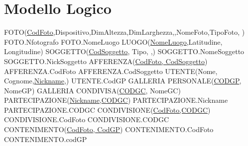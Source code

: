 \chapter{Modello Logico}

FOTO(\underline{CodFoto},Dispositivo,DimAltezza,DimLarghezza,\newline{},NomeFoto,TipoFoto, )
\newline
FOTO.Nfotografo
\newline
FOTO.NomeLuogo
\newline
\newline
LUOGO(\underline{NomeLuogo},Latitudine, Longitudine)
\newline
\newline
SOGGETTO(\underline{CodSoggetto}, Tipo, ,)
\newline
SOGGETTO.NomeSoggetto
\newline
SOGGETTO.NickSoggetto
\newline
\newline
AFFERENZA(\underline{CodFoto, CodSoggetto})
\newline
AFFERENZA.CodFoto
\newline
AFFERENZA.CodSoggetto
\newline
\newline
UTENTE(Nome, Cognome,\underline{Nickname},)
\newline
UTENTE.CodGP
\newline
\newline
GALLERIA PERSONALE(\underline{CODGP}, NomeGP)
\newline
\newline
GALLERIA CONDIVISA(\underline{CODGC}, NomeGC)
\newline
\newline
PARTECIPAZIONE(\underline{Nickname,CODGC})
\newline
PARTECIPAZIONE.Nickname
\newline
PARTECIPAZIONE.CODGC
\newline
\newline
CONDIVISIONE(\underline{CodFoto,CODGC})
\newline
CONDIVISIONE.CodFoto
\newline
CONDIVISIONE.CODGC
\newline
\newline
CONTENIMENTO(\underline{CodFoto, CodGP})
\newline
CONTENIMENTO.CodFoto
\newline
CONTENIMENTO.codGP
\newline

